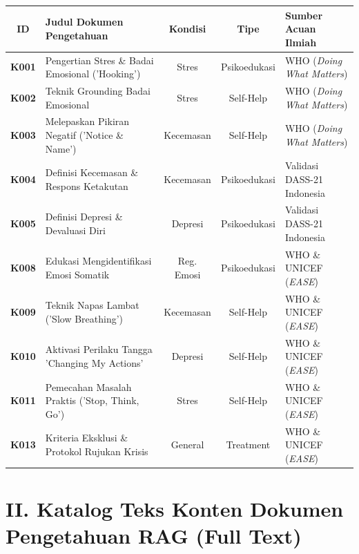 \documentclass[11pt,a4paper]{article}
\begin{document}
\begin{table}[H]
\centering
\small
\begin{tabular}{|c|>{\raggedright\arraybackslash}p{5.0cm}|c|c|>{\raggedright\arraybackslash}p{3.8cm}|}
\hline
\rowcolor{LunaTableHead}
\textbf{ID} & \textbf{Judul Dokumen Pengetahuan} & \textbf{Kondisi} & \textbf{Tipe} & \textbf{Sumber Acuan Ilmiah} \\ \hline
\textbf{K001} & Pengertian Stres \& Badai Emosional ('Hooking') & Stres & Psikoedukasi & WHO (\textit{Doing What Matters}) \\ \hline
\textbf{K002} & Teknik Grounding Badai Emosional & Stres & Self-Help & WHO (\textit{Doing What Matters}) \\ \hline
\textbf{K003} & Melepaskan Pikiran Negatif ('Notice \& Name') & Kecemasan & Self-Help & WHO (\textit{Doing What Matters}) \\ \hline
\textbf{K004} & Definisi Kecemasan \& Respons Ketakutan & Kecemasan & Psikoedukasi & Validasi DASS-21 Indonesia \\ \hline
\textbf{K005} & Definisi Depresi \& Devaluasi Diri & Depresi & Psikoedukasi & Validasi DASS-21 Indonesia \\ \hline
\textbf{K008} & Edukasi Mengidentifikasi Emosi Somatik & Reg. Emosi & Psikoedukasi & WHO \& UNICEF (\textit{EASE}) \\ \hline
\textbf{K009} & Teknik Napas Lambat ('Slow Breathing') & Kecemasan & Self-Help & WHO \& UNICEF (\textit{EASE}) \\ \hline
\textbf{K010} & Aktivasi Perilaku Tangga 'Changing My Actions' & Depresi & Self-Help & WHO \& UNICEF (\textit{EASE}) \\ \hline
\textbf{K011} & Pemecahan Masalah Praktis ('Stop, Think, Go') & Stres & Self-Help & WHO \& UNICEF (\textit{EASE}) \\ \hline
\textbf{K013} & Kriteria Eksklusi \& Protokol Rujukan Krisis & General & Treatment & WHO \& UNICEF (\textit{EASE}) \\ \hline
\end{tabular}
\end{table}

\vspace{0.4cm}

\section*{\color{LunaPrimary} II. Katalog Teks Konten Dokumen Pengetahuan RAG (Full Text)}
\end{document}
